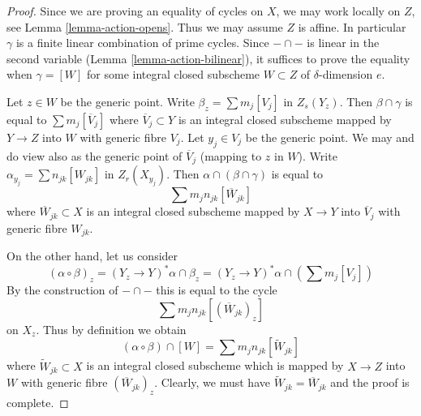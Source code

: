 \documentclass{stacks-project}
\theoremstyle{plain}
\theoremstyle{definition}
\theoremstyle{remark}
\numberwithin{equation}{subsection}
\begin{document}
\begin{proof}
Since we are proving an equality of cycles on $X$, we may work locally
on $Z$, see Lemma \ref{lemma-action-opens}. Thus we may assume $Z$
is affine. In particular $\gamma$ is a finite linear combination of prime
cycles. Since $- \cap -$ is linear in the second variable
(Lemma \ref{lemma-action-bilinear}), it suffices
to prove the equality when $\gamma = [W]$ for some integral closed subscheme
$W \subset Z$ of $\delta$-dimension $e$.

\medskip\noindent
Let $z \in W$ be the generic point. Write $\beta_z = \sum m_j[V_j]$
in $Z_s(Y_z)$. Then $\beta \cap \gamma$ is equal to $\sum m_j[\overline{V}_j]$
where $\overline{V}_j \subset Y$ is an integral closed subscheme
mapped by $Y \to Z$ into $W$ with generic fibre $V_j$.
Let $y_j \in V_j$ be the generic point. We may and do view
also as the generic point of $\overline{V}_j$ (mapping to $z$ in $W$).
Write $\alpha_{y_j} = \sum n_{jk} [W_{jk}]$ in $Z_r(X_{y_j})$.
Then $\alpha \cap (\beta \cap \gamma)$ is equal to
$$
\sum m_j n_{jk} [\overline{W}_{jk}]
$$
where $\overline{W}_{jk} \subset X$ is an integral closed subscheme
mapped by $X \to Y$ into $\overline{V}_j$ with generic fibre $W_{jk}$.

\medskip\noindent
On the other hand, let us consider
$$
(\alpha \circ \beta)_z = (Y_z \to Y)^*\alpha \cap \beta_z =
(Y_z \to Y)^*\alpha \cap (\sum m_j [V_j])
$$
By the construction of $- \cap -$ this is equal to the cycle
$$
\sum m_j n_{jk} [(\overline{W}_{jk})_z]
$$
on $X_z$. Thus by definition we obtain
$$
(\alpha \circ \beta) \cap [W] =
\sum m_j n_{jk} [\widetilde{W}_{jk}]
$$
where $\widetilde{W}_{jk} \subset X$ is an integral closed subscheme which
is mapped by $X \to Z$ into $W$ with generic fibre $(\overline{W}_{jk})_z$.
Clearly, we must have $\widetilde{W}_{jk} = \overline{W}_{jk}$
and the proof is complete.
\end{proof}
\end{document}
